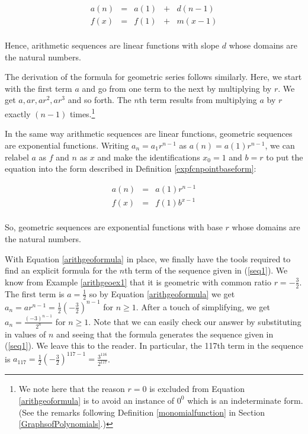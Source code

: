 \documentclass{ximera}
\begin{document}
\[ \begin{array}{ccccc}
a(n) & = & a(1) & + & d (n-1) \\
 f(x) & = & f(1) & + & m (x-1) \\ \end{array} \]


Hence,  arithmetic sequences are linear functions with slope $d$ whose domains are the natural numbers.


The derivation of the formula for geometric series follows similarly.  Here, we start with the first term $a$ and go from one term to the next by multiplying by $r$.  We get $a, ar, ar^2, ar^3$ and so forth.  The $n$th term results from multiplying $a$ by $r$ exactly $(n-1)$ times.\footnote{We note here that the reason $r=0$ is excluded from Equation \ref{arithgeoformula} is to avoid an instance of $0^{0}$ which is an indeterminate form. (See the remarks following Definition \ref{monomialfunction} in Section \ref{GraphsofPolynomials}.)} 

In the same way  arithmetic sequences are linear functions, geometric sequences are exponential functions.  Writing  $a_{n} = a_{1} r^{n-1}$ as $a(n) = a(1) r^{n-1}$,  we can relabel $a$ as $f$ and $n$ as $x$ and make the identifications $x_{0} = 1$ and $b = r$ to put the equation into the form described in  Definition \ref{expfcnpointbaseform}:

\[ \begin{array}{ccc}
a(n) & = & a(1) r^{n-1} \\
 f(x) & = & f(1) b^{x-1} \\ \end{array} \]

So, geometric sequences are exponential functions with base $r$ whose domains are the natural numbers.

With Equation \ref{arithgeoformula} in place, we finally have the tools required to find an explicit formula for the $n$th term of the sequence given in (\ref{seq1}). We know from Example \ref{arithgeoex1} that it is geometric with common ratio $r = -\frac{3}{2}$.  The first term is $a = \frac{1}{2}$ so by Equation \ref{arithgeoformula} we get $a_{n} = ar^{n-1} = \frac{1}{2} \left( - \frac{3}{2}\right)^{n-1}$ for $n \geq 1$.  After a touch of simplifying, we get $a_{n} = \frac{(-3)^{n-1}}{2^{n}}$ for $n \geq 1$. Note that we can easily check our answer by substituting in values of $n$ and seeing that the formula generates the sequence given in (\ref{seq1}).  We leave this to the reader.  In particular, the 117th term in the sequence is $a_{117} = \frac{1}{2} \left(-\frac{3}{2} \right)^{117-1} = \frac{3^{116}}{2^{117}}$.
\end{document}

